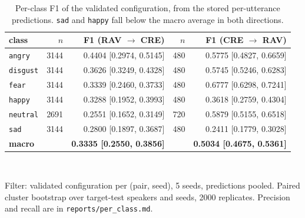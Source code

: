 \begin{table}[!t]
  \centering
  \caption{Per-class F1 of the validated configuration, from the stored per-utterance predictions. \texttt{sad} and \texttt{happy} fall below the macro average in both directions.}
  \label{tab:perclass}
  \begin{tabular}{lrrrr}
    \toprule
    class & $n$ & F1 (RAV $\rightarrow$ CRE) & $n$ & F1 (CRE $\rightarrow$ RAV) \\
    \midrule
    \texttt{angry} & 3144 & 0.4404 [0.2974, 0.5145] & 480 & 0.5775 [0.4827, 0.6659] \\
    \texttt{disgust} & 3144 & 0.3626 [0.3249, 0.4328] & 480 & 0.5745 [0.5246, 0.6283] \\
    \texttt{fear} & 3144 & 0.3339 [0.2460, 0.3733] & 480 & 0.6777 [0.6298, 0.7241] \\
    \texttt{happy} & 3144 & 0.3288 [0.1952, 0.3993] & 480 & 0.3618 [0.2759, 0.4304] \\
    \texttt{neutral} & 2691 & 0.2551 [0.1652, 0.3149] & 720 & 0.5879 [0.5155, 0.6518] \\
    \texttt{sad} & 3144 & 0.2800 [0.1897, 0.3687] & 480 & 0.2411 [0.1779, 0.3028] \\
    \textbf{macro} &  & \textbf{0.3335 [0.2550, 0.3856]} &  & \textbf{0.5034 [0.4675, 0.5361]} \\
    \bottomrule
  \end{tabular}
  \\[2pt]
  \begin{minipage}{\linewidth}\footnotesize Filter: validated configuration per (pair, seed), 5 seeds, predictions pooled. Paired cluster bootstrap over target-test speakers and seeds, 2000 replicates. Precision and recall are in \texttt{reports/per\_class.md}.\end{minipage}
\end{table}
